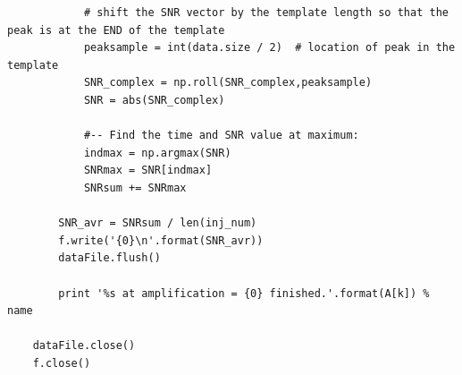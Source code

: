 \documentclass[aps,prd,preprint]{revtex4}
\begin{document}
\begin{lstlisting}
            # shift the SNR vector by the template length so that the peak is at the END of the template
            peaksample = int(data.size / 2)  # location of peak in the template
            SNR_complex = np.roll(SNR_complex,peaksample)
            SNR = abs(SNR_complex)

            #-- Find the time and SNR value at maximum:
            indmax = np.argmax(SNR)
            SNRmax = SNR[indmax]
            SNRsum += SNRmax

        SNR_avr = SNRsum / len(inj_num)
        f.write('{0}\n'.format(SNR_avr))
        dataFile.flush()

        print '%s at amplification = {0} finished.'.format(A[k]) % name

    dataFile.close()
    f.close()
\end{lstlisting}
\end{document}

